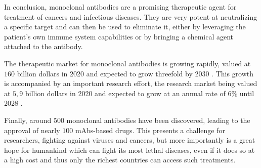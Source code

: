 In conclusion, monoclonal antibodies are a promising therapeutic agent for
treatment of cancers and infectious diseases. They are very potent at neutralizing
a specific target and can then be used to eliminate it, either by leveraging the patient's
own immune system capabilities or by bringing a chemical agent attached to the antibody.

The therapeutic market for monoclonal antibodies is growing rapidly, valued
at $160$ billion dollars in 2020 and expected to grow threefold by 2030
\cite{terdale_monoclonal_2021} \cite{insights_monoclonal_2021}.
This growth is accompanied by an important research effort, the research market
being valued at $5,9$ billion dollars in 2020 and expected to grow
at an annual rate of $6 \%$ until 2028 \cite{markets_global_2021}.

Finally, around $500$ monoclonal antibodies have been discovered, leading to
the approval of nearly $100$ mAbs-based drugs. This presents a challenge for
researchers, fighting against viruses and cancers, but more importantly is a great
hope for humankind which can fight its most lethal diseases, even if it does so
at a high cost and thus only the richest countries can access such treatments.